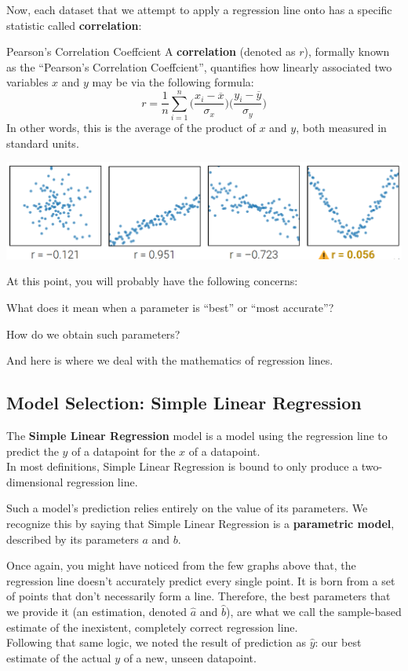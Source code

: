 Now, each dataset that we attempt to apply a regression line onto has a specific statistic called \textbf{correlation}:
\begin{ln-define}{Pearson's Correlation Coeffcient}{}
    A \textbf{correlation} (denoted as $r$), formally known as the ``Pearson's Correlation Coeffcient'', quantifies how linearly associated two variables $x$ and $y$ may be via the following formula:
    \[
        r = \frac{1}{n} \sum_{i = 1}^n \bigg( \frac{x_i - \overline{x}}{\sigma_x} \bigg) \bigg( \frac{y_i - \overline{y}}{\sigma_y} \bigg)
    \]
    In other words, this is the average of the product of $x$ and $y$, both measured in standard units.
    \begin{center}
        \includegraphics[scale=0.4]{figs/ln01/linear-correlation.png}
    \end{center}
\end{ln-define}

At this point, you will probably have the following concerns:
\begin{bindenum}
    \item What does it mean when a parameter is ``best'' or ``most accurate''?
    \item How do we obtain such parameters?
\end{bindenum}
And here is where we deal with the mathematics of regression lines.

\subsection{Model Selection: Simple Linear Regression}
The \textbf{Simple Linear Regression} model is a model using the regression line to predict the $y$ of a datapoint for the $x$ of a datapoint. \\
In most definitions, Simple Linear Regression is bound to only produce a two-dimensional regression line.

Such a model's prediction relies entirely on the value of its parameters. We recognize this by saying that Simple Linear Regression is a \textbf{parametric model}, described by its parameters $a$ and $b$.

Once again, you might have noticed from the few graphs above that, the regression line doesn't accurately predict every single point. It is born from a set of points that don't necessarily form a line. Therefore, the best parameters that we provide it (an estimation, denoted $\hat{a}$ and $\hat{b}$), are what we call the sample-based estimate of the inexistent, completely correct regression line. \\
Following that same logic, we noted the result of prediction as $\hat{y}$: our best estimate of the actual $y$ of a new, unseen datapoint.

